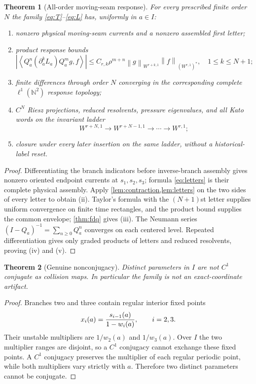 \documentclass[11pt,reqno]{amsart}
\newtheorem{theorem}{Theorem}[section]
\theoremstyle{definition}
\theoremstyle{remark}
\newcommand{\N}{\mathbb N}
\newcommand{\norm}[1]{\left\lVert #1\right\rVert}
\newcommand{\abs}[1]{\left\lvert #1\right\rvert}
\newcommand{\pair}[2]{\left\langle #1,#2\right\rangle}
\begin{document}
\begin{theorem}[All-order moving-seam response]\label{thm:allorder}
For every prescribed finite order $N$ the family \eqref{eq:T}--\eqref{eq:L}
has, uniformly in $a\in I$:
\begin{enumerate}[label=(\roman*)]
\item nonzero physical moving-seam currents and a nonzero assembled first
letter;
\item product response bounds
\[
 \abs{\pair{Q_a^n(\partial_a^kL_a)Q_a^m g}{f}}
 \le C_{r,k}\rho^{m+n}
 \norm g_{W^{r+k,1}}\norm f_{(W^{r,1})^*},
 \quad 1\le k\le N+1;
\]
\item finite differences through order $N$ converging in the corresponding
complete $\ell^1(\N^2)$ response topology;
\item $C^N$ Riesz projections, reduced resolvents, pressure eigenvalues, and
all Kato words on the invariant ladder
\[
 W^{r+N,1}\to W^{r+N-1,1}\to\cdots\to W^{r,1};
\]
\item closure under every later insertion on the same ladder, without a
historical-label reset.
\end{enumerate}
\end{theorem}

\begin{proof}
Differentiating the branch indicators before inverse-branch assembly gives
nonzero oriented endpoint currents at $s_1,s_2,s_3$; formula
\eqref{eq:letters} is their complete physical assembly.  Apply
\cref{lem:contraction,lem:letters} on the two sides of every letter to obtain
(ii).  Taylor's formula with the $(N+1)$st letter supplies uniform convergence
on finite time rectangles, and the product bound supplies the common envelope;
\cref{thm:fdq} gives (iii).  The Neumann series
$(I-Q_a)^{-1}=\sum_{n\ge0}Q_a^n$ converges on each centered level.
Repeated differentiation gives only graded products of letters and reduced
resolvents, proving (iv) and (v).
\end{proof}

\begin{theorem}[Genuine nonconjugacy]\label{thm:nonconjugacy}
Distinct parameters in $I$ are not $C^1$ conjugate as collision maps.  In
particular the family is not an exact-coordinate artifact.
\end{theorem}

\begin{proof}
Branches two and three contain regular interior fixed points
\[
 x_i(a)={s_{i-1}(a)\over1-w_i(a)},\qquad i=2,3.
\]
Their unstable multipliers are $1/w_2(a)$ and $1/w_3(a)$.  Over $I$ the two
multiplier ranges are disjoint, so a $C^1$ conjugacy cannot exchange these
fixed points.  A $C^1$ conjugacy preserves the multiplier of each regular
periodic point, while both multipliers vary strictly with $a$.  Therefore two
distinct parameters cannot be conjugate.
\end{proof}
\end{document}
